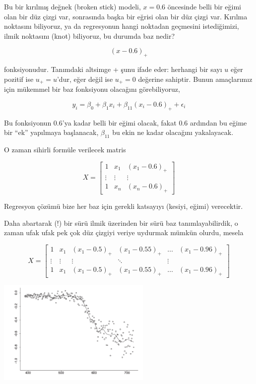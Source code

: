 \documentclass[12pt,fleqn]{article}\usepackage{../../common}
\begin{document}
Bu bir kırılmış değnek (broken stick) modeli, $x=0.6$ öncesinde belli bir
eğimi olan bir düz çizgi var, sonrasında başka bir eğrisi olan bir düz
çizgi var. Kırılma noktasını biliyoruz, ya da regresyonun hangi noktadan
geçmesini istediğimizi, ilmik noktasını (knot) biliyoruz, bu durumda baz
nedir? 

$$
(x-0.6)_{+}
$$ 

fonksiyonudur. Tanımdaki altsimge + şunu ifade eder: herhangi bir sayı $u$
eğer pozitif ise $u_{+} = u$'dur, eğer değil ise $u_{+} = 0$ değerine
sahiptir. Bunun amaçlarımız için mükemmel bir baz fonksiyonu olacağını
görebiliyoruz, 

$$y_i = \beta_0 + \beta_1x_i + \beta_{11}(x_i-0.6)_{+} + \epsilon_i $$

Bu fonksiyonun $0.6$'ya kadar belli bir eğimi olacak, fakat $0.6$ ardından
bu eğime bir ``ek'' yapılmaya başlanacak, $\beta_{11}$ bu ekin ne kadar
olacağını yakalayacak. 

O zaman sihirli formüle verilecek matris

$$ 
X = 
\left[\begin{array}{ccc}
1 & x_1 & (x_1 - 0.6)_{+} \\ 
\vdots & \vdots & \vdots \\
1 & x_n & (x_n - 0.6)_{+}
\end{array}\right]
$$

Regresyon çözümü bize her baz için gerekli katsayıyı (kesiyi, eğimi)
verecektir. 

Daha abartarak (!) bir sürü ilmik üzerinden bir sürü baz tanımlayabilirdik,
o zaman ufak ufak pek çok düz çizgiyi veriye uydurmak mümkün olurdu, mesela

$$ X = 
\left[\begin{array}{cccccc}
1 & x_1 & (x_1 - 0.5)_{+} & (x_1 - 0.55)_{+} & \dots & (x_1 - 0.96)_{+}\\ 
\vdots & \vdots & \vdots & \ddots & \vdots \\
1 & x_1 & (x_1 - 0.5)_{+} & (x_1 - 0.55)_{+} & \dots & (x_1 - 0.96)_{+}
\end{array}\right]
$$

\includegraphics[width=20em]{compscieng_app20_05.png}
\end{document}
